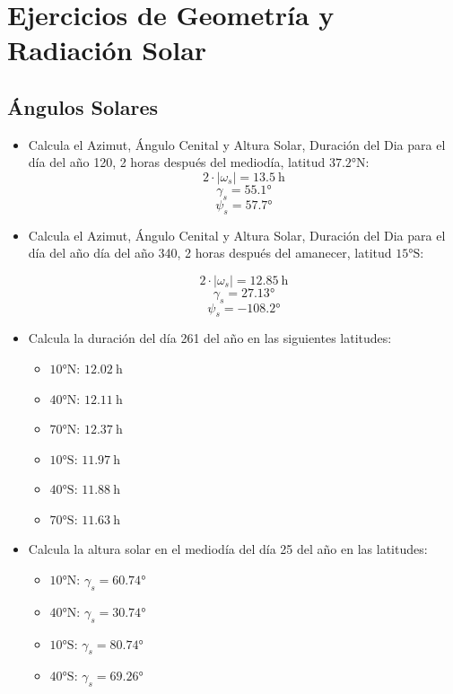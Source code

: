 \chapter{Ejercicios de Geometría y Radiación Solar}


\section{Ángulos Solares}

\begin{itemize}
\item Calcula el Azimut, Ángulo Cenital y Altura Solar, Duración del
  Dia para el día del año 120, 2 horas después del mediodía, latitud
  $\ang{37.2}\mathrm{N}$:
  \[
    2\cdot\left|\omega_{s}\right|=\SI{13.5}{\hour}\]
  \[
    \gamma_{s}=\ang{55.1}\]
  \[
    \psi_{s}=\ang{57.7}\]

\item Calcula el Azimut, Ángulo Cenital y Altura Solar, Duración del
  Dia para el día del año día del año 340, 2 horas después del
  amanecer, latitud $\ang{15}\mathrm{S}$:

\[
  2\cdot\left|\omega_{s}\right|=\SI{12.85}{\hour}\]
\[
  \gamma_{s}=\ang{27.13}\]
\[
  \psi_{s}=\ang{-108.2}\]

\item Calcula la duración del día 261 del año en las siguientes
  latitudes:

  \begin{itemize}
  \item $\ang{10}\mathrm{N}$: $\SI{12.02}{\hour}$
  \item $\ang{40}\mathrm{N}$: $\SI{12.11}{\hour}$
  \item $\ang{70}\mathrm{N}$: $\SI{12.37}{\hour}$
  \item $\ang{10}\mathrm{S}$: $\SI{11.97}{\hour}$
  \item $\ang{40}\mathrm{S}$: $\SI{11.88}{\hour}$
  \item $\ang{70}\mathrm{S}$: $\SI{11.63}{\hour}$
  \end{itemize}

\item Calcula la altura solar en el mediodía del día 25 del año en las
  latitudes:

  \begin{itemize}
  \item $\ang{10}\mathrm{N}$: $\gamma_{s}=\ang{60.74}$
  \item $\ang{40}\mathrm{N}$: $\gamma_{s}=\ang{30.74}$
  \item $\ang{10}\mathrm{S}$: $\gamma_{s}=\ang{80.74}$
  \item $\ang{40}\mathrm{S}$: $\gamma_{s}=\ang{69.26}$
  \end{itemize}


\end{itemize}
